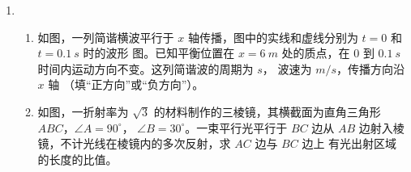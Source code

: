 \begin{enumerate}
\begin{enumerate}






\end{enumerate}


\newpage




\item 
\begin{enumerate}
\item
如图，一列简谐横波平行于 $ x $ 轴传播，图中的实线和虚线分别为 $ t=0 $ 和 $ t=0.1 \ s $ 时的波形
图。已知平衡位置在 $ x=6 \ m $ 处的质点，在 $ 0 $ 到 $ 0.1 \ s $ 时间内运动方向不变。这列简谐波的周期为 \underlinegap $ s $，
波速为 \underlinegap $ m/s $，传播方向沿 $ x $ 轴 \underlinegap （填“正方向”或“负方向”）。
\begin{figure}[h!]
\centering

\end{figure}







\item 
如图，一折射率为 $ \sqrt{3} $ 的材料制作的三棱镜，其横截面为直角三角形 $ ABC $，$ \angle A=90 ^{ \circ } $，
$ \angle B=30 ^{ \circ } $。一束平行光平行于 $ BC $ 边从 $ AB $ 边射入棱镜，不计光线在棱镜内的多次反射，求 $ AC $ 边与 $ BC $ 边上
有光出射区域的长度的比值。
\begin{figure}[h!]
\flushright

\end{figure}


\end{enumerate}
\end{enumerate}
